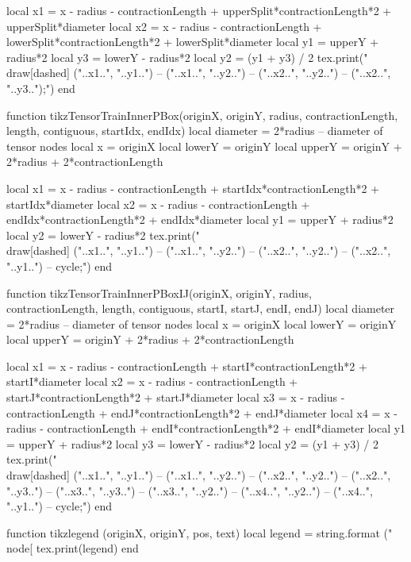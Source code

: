 \begin{luacode*}
	 local x1 = x - radius - contractionLength + upperSplit*contractionLength*2 + upperSplit*diameter
	 local x2 = x - radius - contractionLength + lowerSplit*contractionLength*2 + lowerSplit*diameter
	 local y1 = upperY + radius*2
	 local y3 = lowerY - radius*2
	 local y2 = (y1 + y3) / 2
	 tex.print("\\draw[dashed] ("..x1..", "..y1..") -- ("..x1..", "..y2..") -- ("..x2..", "..y2..") -- ("..x2..", "..y3..");")
end

function tikzTensorTrainInnerPBox(originX, originY, radius, contractionLength, length, contiguous, startIdx, endIdx)
	 local diameter = 2*radius         -- diameter of tensor nodes
	 local x = originX
	 local lowerY = originY
	 local upperY = originY + 2*radius + 2*contractionLength

	 local x1 = x - radius - contractionLength + startIdx*contractionLength*2 + startIdx*diameter
	 local x2 = x - radius - contractionLength + endIdx*contractionLength*2 + endIdx*diameter
	 local y1 = upperY + radius*2
	 local y2 = lowerY - radius*2
	 tex.print("\\draw[dashed] ("..x1..", "..y1..") -- ("..x1..", "..y2..") -- ("..x2..", "..y2..") -- ("..x2..", "..y1..") -- cycle;")
end

function tikzTensorTrainInnerPBoxIJ(originX, originY, radius, contractionLength, length, contiguous, startI, startJ, endI, endJ)
	 local diameter = 2*radius         -- diameter of tensor nodes
	 local x = originX
	 local lowerY = originY
	 local upperY = originY + 2*radius + 2*contractionLength

	 local x1 = x - radius - contractionLength + startI*contractionLength*2 + startI*diameter
	 local x2 = x - radius - contractionLength + startJ*contractionLength*2 + startJ*diameter
	 local x3 = x - radius - contractionLength + endJ*contractionLength*2 + endJ*diameter
	 local x4 = x - radius - contractionLength + endI*contractionLength*2 + endI*diameter
	 local y1 = upperY + radius*2
	 local y3 = lowerY - radius*2
	 local y2 = (y1 + y3) / 2
	 tex.print("\\draw[dashed] ("..x1..", "..y1..") -- ("..x1..", "..y2..") -- ("..x2..", "..y2..") -- ("..x2..", "..y3..") -- ("..x3..", "..y3..") -- ("..x3..", "..y2..") -- ("..x4..", "..y2..") -- ("..x4..", "..y1..") -- cycle;")
end

function tikzlegend (originX, originY, pos, text)
	 local legend = string.format ("\\node[%
	 tex.print(legend)
end


\end{luacode*}
